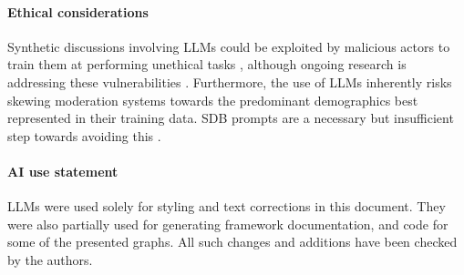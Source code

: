 %
\paragraph{Ethical considerations} 
Synthetic discussions involving LLMs could be exploited by malicious actors to train them at performing unethical tasks \cite{majumdar_2024_nefarious, MARULLI20245340, li_2025_vulnerable}, although ongoing research is addressing these vulnerabilities \cite{wang_2025_risk}. Furthermore, the use of LLMs inherently risks skewing moderation systems towards the predominant demographics best represented in their training data. SDB prompts are a necessary but insufficient step towards avoiding this \cite{rossi_2024, anthis_2025, burton2024large}.

\paragraph{AI use statement} LLMs were used solely for styling and text corrections in this document. They were also partially used for generating framework documentation, and code for some of the presented graphs. All such changes and additions have been checked by the authors.
